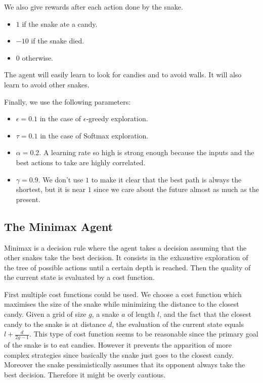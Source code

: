 \documentclass[journal, a4paper]{IEEEtran}
\begin{document}
We also give rewards after each action done by the snake.
\begin{itemize}
    \item $1$ if the snake ate a candy.
    \item $-10$ if the snake died.
    \item $0$ otherwise.
\end{itemize}

The agent will easily learn to look for candies and to avoid walls.
It will also learn to avoid other snakes.

Finally, we use the following parameters:
\begin{itemize}
    \item $\epsilon = 0.1$ in the case of $\epsilon$-greedy exploration.
    \item $\tau = 0.1$ in the case of Softmax exploration.
    \item $\alpha = 0.2$. A learning rate so high is strong enough because the inputs and the best actions to take are highly correlated.
    \item $\gamma = 0.9$. We don't use $1$ to make it clear that the best path is always the shortest, but it is near $1$ since we care about the future almost as much as the present.
\end{itemize}

\subsection{The Minimax Agent}
Minimax is a decision rule where the agent takes a decision assuming that the other snakes take the best decision. It consists in the exhaustive exploration of the tree of possible actions until a certain depth is reached. Then the quality of the current state is evaluated by a cost function. 

First multiple cost functions could be used. We choose a cost function which maximises the size of the snake while minimizing the distance to the closest candy. Given a grid of size $g$, a snake $a$ of length $l$, and the fact that the closest candy to the snake is at distance $d$, the evaluation of the current state equals $l+\tfrac{d}{2g-1}$. This type of cost function seems to be reasonable since the primary goal of the snake is to eat candies. However it prevents the apparition of more complex strategies since basically the snake just goes to the closest candy. Moreover the snake pessimistically assumes that its opponent always take the best decision. Therefore it might be overly cautious.
\end{document}
